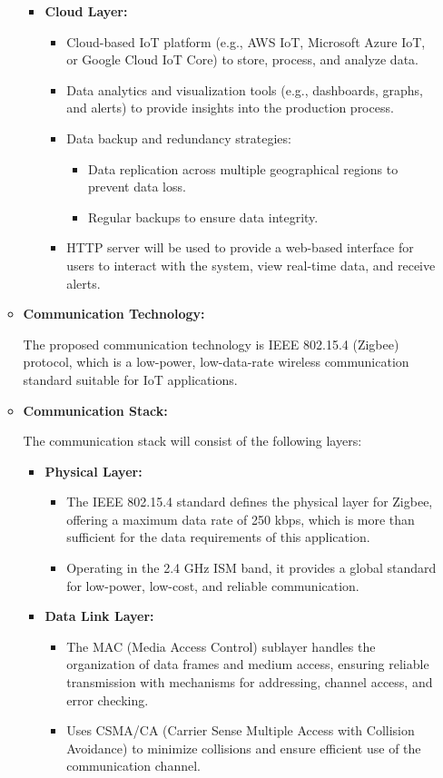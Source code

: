 \documentclass{article}
\begin{document}
\begin{enumerate}
\begin{itemize}
\begin{itemize}
    \item \textbf{Cloud Layer:}

\begin{itemize}
    \item Cloud-based IoT platform (e.g., AWS IoT, Microsoft Azure IoT, or Google Cloud IoT Core) to store, process, and analyze data.
    \item Data analytics and visualization tools (e.g., dashboards, graphs, and alerts) to provide insights into the production process.
    \item Data backup and redundancy strategies:
    \begin{itemize}
        \item Data replication across multiple geographical regions to prevent data loss.
        \item Regular backups to ensure data integrity.
    \end{itemize}
    \item HTTP server will be used to provide a web-based interface for users to interact with the system, view real-time data, and receive alerts.
\end{itemize}

\end{itemize}

\item \textbf{Communication Technology:}

The proposed communication technology is IEEE 802.15.4 (Zigbee) protocol, which is a low-power, low-data-rate wireless communication standard suitable for IoT applications. 

\item \textbf{Communication Stack:}

The communication stack will consist of the following layers:

\begin{itemize}
    \item \textbf{Physical Layer:}
    \begin{itemize}
        \item The IEEE 802.15.4 standard defines the physical layer for Zigbee, offering a maximum data rate of 250 kbps, which is more than sufficient for the data requirements of this application.
        \item Operating in the 2.4 GHz ISM band, it provides a global standard for low-power, low-cost, and reliable communication.
    \end{itemize}
    
    \item \textbf{Data Link Layer:}
    \begin{itemize}
        \item The MAC (Media Access Control) sublayer handles the organization of data frames and medium access, ensuring reliable transmission with mechanisms for addressing, channel access, and error checking.
        \item Uses CSMA/CA (Carrier Sense Multiple Access with Collision Avoidance) to minimize collisions and ensure efficient use of the communication channel.
    \end{itemize}


\end{itemize}
\end{itemize}
\end{enumerate}
\end{document}
